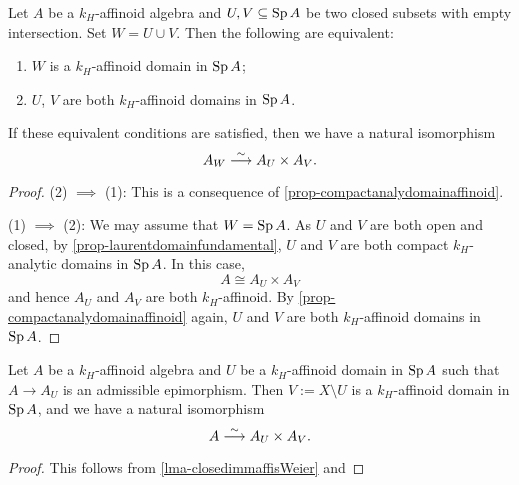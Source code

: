\begin{corollary}\label{cor-affandclosedimmdecomposition}
    Let $A$ be a $k_H$-affinoid algebra and $U,V\subseteq \operatorname{Sp} A$ be two closed subsets with empty intersection. Set $W=U\cup V$. Then the following are equivalent:
    \begin{enumerate}
        \item $W$ is a $k_H$-affinoid domain in $\operatorname{Sp} A$;
        \item $U$, $V$ are both $k_H$-affinoid domains in $\operatorname{Sp} A$.
    \end{enumerate}
    If these equivalent conditions are satisfied, then we have a natural isomorphism
    \[
        A_W\stackrel{\sim}{\longrightarrow} A_U\times A_V.  
    \]
\end{corollary}
\begin{proof}
    (2) $\implies$ (1): This is a consequence of \cref{prop-compactanalydomainaffinoid}.

    (1) $\implies$ (2): We may assume that $W=\operatorname{Sp} A$. As $U$ and $V$ are both open and closed, by \cref{prop-laurentdomainfundamental}, $U$ and $V$ are both compact $k_H$-analytic domains in $\operatorname{Sp} A$. In this case,
    \[
        A\cong A_U\times A_V  
    \]
    and hence $A_U$ and $A_V$ are both $k_H$-affinoid. By \cref{prop-compactanalydomainaffinoid} again, $U$ and $V$ are both $k_H$-affinoid domains in $\operatorname{Sp} A$. 
\end{proof}

\begin{corollary}
    Let $A$ be a $k_H$-affinoid algebra and $U$ be a $k_H$-affinoid domain in $\operatorname{Sp} A$ such that $A\rightarrow A_U$ is an admissible epimorphism. Then $V:=X\setminus U$ is a $k_H$-affinoid domain in $\operatorname{Sp} A$, and we have a natural isomorphism
    \[
        A\stackrel{\sim}{\longrightarrow} A_U\times A_V.  
    \]
\end{corollary}
\begin{proof}
    This follows from \cref{lma-closedimmaffisWeier} and 
\end{proof}


